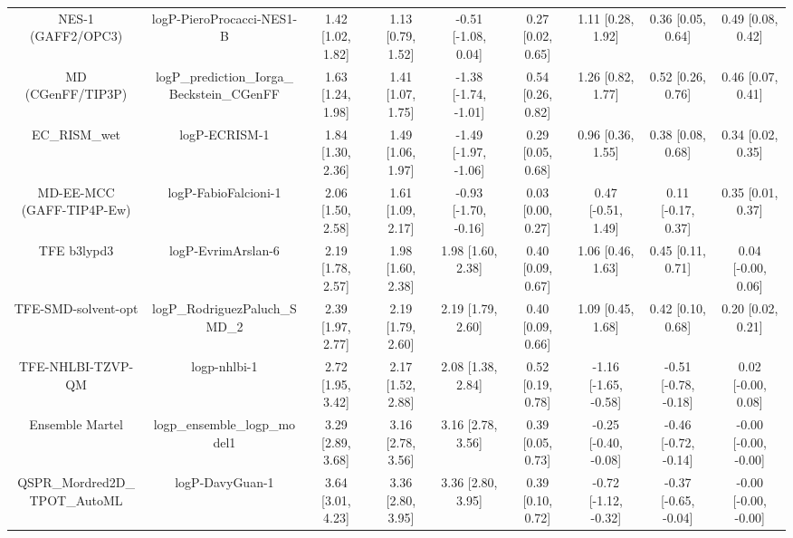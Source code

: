 \documentclass{article}
\begin{document}
\begin{center}
\begin{longtable}{|ccccccccc|}
         NES-1 (GAFF2/OPC3) &                   logP-PieroProcacci-NES1-B &  1.42 [1.02, 1.82] &  1.13 [0.79, 1.52] &   -0.51 [-1.08, 0.04] &  0.27 [0.02, 0.65] &     1.11 [0.28, 1.92] &     0.36 [0.05, 0.64] &     0.49 [0.08, 0.42] \\
          MD (CGenFF/TIP3P) &  logP\_prediction\_Iorga\_Beckstein\_CGenFF &  1.63 [1.24, 1.98] &  1.41 [1.07, 1.75] &  -1.38 [-1.74, -1.01] &  0.54 [0.26, 0.82] &     1.26 [0.82, 1.77] &     0.52 [0.26, 0.76] &     0.46 [0.07, 0.41] \\
                EC_RISM_wet &                               logP-ECRISM-1 &  1.84 [1.30, 2.36] &  1.49 [1.06, 1.97] &  -1.49 [-1.97, -1.06] &  0.29 [0.05, 0.68] &     0.96 [0.36, 1.55] &     0.38 [0.08, 0.68] &     0.34 [0.02, 0.35] \\
  MD-EE-MCC (GAFF-TIP4P-Ew) &                        logP-FabioFalcioni-1 &  2.06 [1.50, 2.58] &  1.61 [1.09, 2.17] &  -0.93 [-1.70, -0.16] &  0.03 [0.00, 0.27] &    0.47 [-0.51, 1.49] &    0.11 [-0.17, 0.37] &     0.35 [0.01, 0.37] \\
                TFE b3lypd3 &                          logP-EvrimArslan-6 &  2.19 [1.78, 2.57] &  1.98 [1.60, 2.38] &     1.98 [1.60, 2.38] &  0.40 [0.09, 0.67] &     1.06 [0.46, 1.63] &     0.45 [0.11, 0.71] &    0.04 [-0.00, 0.06] \\
        TFE-SMD-solvent-opt &               logP\_RodriguezPaluch\_SMD\_2 &  2.39 [1.97, 2.77] &  2.19 [1.79, 2.60] &     2.19 [1.79, 2.60] &  0.40 [0.09, 0.66] &     1.09 [0.45, 1.68] &     0.42 [0.10, 0.68] &     0.20 [0.02, 0.21] \\
          TFE-NHLBI-TZVP-QM &                                logp-nhlbi-1 &  2.72 [1.95, 3.42] &  2.17 [1.52, 2.88] &     2.08 [1.38, 2.84] &  0.52 [0.19, 0.78] &  -1.16 [-1.65, -0.58] &  -0.51 [-0.78, -0.18] &    0.02 [-0.00, 0.08] \\
            Ensemble Martel &                logp\_ensemble\_logp\_model1 &  3.29 [2.89, 3.68] &  3.16 [2.78, 3.56] &     3.16 [2.78, 3.56] &  0.39 [0.05, 0.73] &  -0.25 [-0.40, -0.08] &  -0.46 [-0.72, -0.14] &  -0.00 [-0.00, -0.00] \\
 QSPR_Mordred2D_TPOT_AutoML &                             logP-DavyGuan-1 &  3.64 [3.01, 4.23] &  3.36 [2.80, 3.95] &     3.36 [2.80, 3.95] &  0.39 [0.10, 0.72] &  -0.72 [-1.12, -0.32] &  -0.37 [-0.65, -0.04] &  -0.00 [-0.00, -0.00] \\
\end{longtable}
\end{center}
\end{document}
